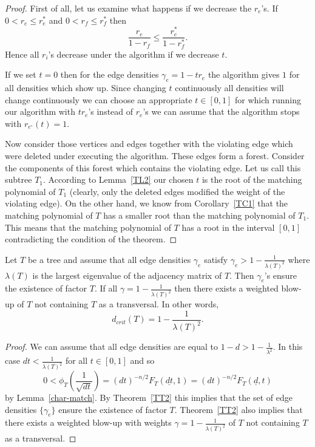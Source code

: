 \documentclass[12pt,a4paper]{amsart}
\numberwithin{equation}{section}
\begin{document}
\begin{proof}
First of all, let us examine what
happens if we decrease the $r_e$'s. If $0<r_e\leq r^*_e$ and $0<r_f\leq r^*_f$
then 
$$\frac{r_e}{1-r_f}\leq \frac{r^*_e}{1-r^*_f}.$$
Hence all $r_i$'s decrease under the algorithm if we decrease $t$.
 
If we set $t=0$ then for the edge densities $\gamma_e=1-tr_e$ the algorithm
gives $1$ for all densities which show up. Since changing $t$ continuously all
densities will change continuously we 
can  choose an appropriate $t\in [0,1]$ for which running our algorithm with
$tr_e$'s instead of $r_e$'s we can assume that the algorithm stops with
$r_{e^{\circ}}(t)= 1$.  

Now consider those vertices and edges
together with the violating edge which were deleted under executing the
algorithm. These edges form a forest. Consider the components of this forest
which contains the violating edge. Let us call this subtree $T_1$. According to
Lemma~\ref{TL2}  our chosen $t$ is the root of the matching polynomial of $T_1$
(clearly, only the deleted edges modified the weight of the violating edge).
On the other hand, we know from Corollary~\ref{TC1} that the matching
polynomial of $T$ has a smaller root than the matching polynomial of $T_1$.
This means that the matching polynomial of $T$ has a root in the interval
$[0,1]$ contradicting the condition of the theorem.  

\end{proof}

\begin{cor} Let $T$ be a tree and assume that all edge densities $\gamma_e$
  satisfy $\gamma_e>1-\frac{1}{\lambda(T)^2}$ where $\lambda(T)$ is the largest
  eigenvalue of the adjacency matrix of $T$. Then $\gamma_e$'s ensure the
  existence of factor $T$. If all $\gamma=1-\frac{1}{\lambda(T)^2}$ then
  there exists a weighted blow-up of $T$ not containing $T$ as a transversal.
In other words,
   $$d_{crit}(T)=1-\frac{1}{\lambda(T)^2}.$$
\end{cor} 

\begin{proof} We can assume that all edge densities are equal to $1-d>
  1-\frac{1}{\lambda^2}$. In this case $dt<\frac{1}{\lambda(T)^2}$ for all $t\in
  [0,1]$ and so
  $$0<\phi_T(\frac{1}{\sqrt{dt}})=(dt)^{-n/2}F_T(\underline{dt},1)=(dt)^{-n/2}F_T(\underline{d},t)$$      
by Lemma~\ref{char-match}.
  By Theorem~\ref{TT2} this implies that the set of edge densities
  $\{\gamma_e\}$ ensure the existence of factor $T$. Theorem~\ref{TT2} also
  implies that  there exists a weighted blow-up with weights
  $\gamma=1-\frac{1}{\lambda(T)^2}$ of $T$ not containing $T$ as a
  transversal.    
\end{proof}
\end{document}

